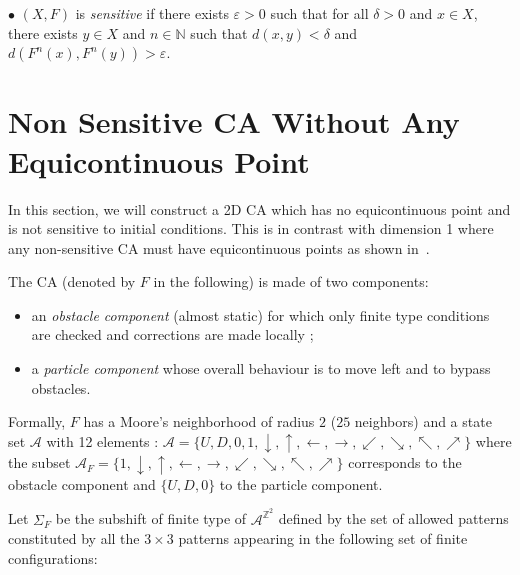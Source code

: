 \documentclass{llncs}
\renewcommand{\epsilon}{\varepsilon}
\newcommand{\N}{\mathbb{N}}
\newcommand{\A}{\mathcal{A}}
\newcommand{\azz}{\mathcal{A}^{\mathbb{Z}^2}}
\newcommand{\dd}{\delta}
\newcommand{\e}{\epsilon}
\newcommand{\acf}{F}
\newcommand{\obst}{\Sigma_{\acf}}
\newcommand{\obstset}{\A_F}
\newcommand{\oT}{\downarrow}
\newcommand{\oB}{\uparrow}
\newcommand{\oL}{\rightarrow}
\newcommand{\oR}{\leftarrow}
\newcommand{\oTL}{\searrow}
\newcommand{\oTR}{\swarrow}
\newcommand{\oBL}{\nearrow}
\newcommand{\oBR}{\nwarrow}
\begin{document}
$\bullet$ $(X,F)$ is {\em sensitive} if there exists $\e>0$ such that
for all $\dd>0$ and $x\in X$, there exists $y\in X$ and $n\in\N$ such
that $d(x,y)<\dd$ and $d(F^n(x),F^n(y))>\e$. 

\section{Non Sensitive CA Without Any Equicontinuous Point}
\label{sec:sensitivity}

In this section, we will construct a 2D CA which has no equicontinuous
point and is not sensitive to initial conditions. This is in contrast
with dimension 1 where any non-sensitive CA must have equicontinuous
points as shown in~\cite{Kurka97}.

The CA (denoted by $\acf$ in the following) is made of two components:
\begin{itemize}
\item an \emph{obstacle component} (almost static) for which only
  finite type conditions are checked and corrections are made locally
  ;
\item a \emph{particle component} whose overall behaviour is to move
  left and to bypass obstacles.
\end{itemize}

Formally, $\acf$ has a Moore's neighborhood of radius $2$ ($25$
neighbors) and a state set $\A$ with 12 elements :
${\A=\bigl\{U,D,0,1,\oT,\oB,\oR,\oL,\oTR,\oTL,\oBR,\oBL\bigr\}}$ where
the subset ${\obstset=\{1,\oT,\oB,\oR,\oL,\oTR,\oTL,\oBR,\oBL\}}$
corresponds to the obstacle component and $\{U,D,0\}$ to the particle
component.

Let $\obst$ be the subshift of finite type of ${\azz}$ defined by the
set of allowed patterns constituted by all the $3\times 3$ patterns
appearing in the following set of finite configurations:
\end{document}
